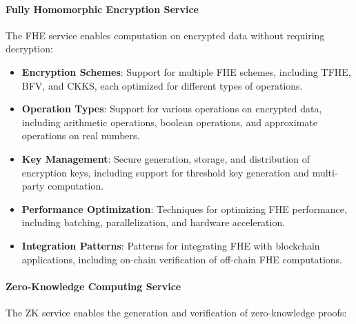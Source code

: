 \paragraph{Fully Homomorphic Encryption Service}
The FHE service enables computation on encrypted data without requiring decryption:

\begin{itemize}
    \item \textbf{Encryption Schemes}: Support for multiple FHE schemes, including TFHE, BFV, and CKKS, each optimized for different types of operations.
    
    \item \textbf{Operation Types}: Support for various operations on encrypted data, including arithmetic operations, boolean operations, and approximate operations on real numbers.
    
    \item \textbf{Key Management}: Secure generation, storage, and distribution of encryption keys, including support for threshold key generation and multi-party computation.
    
    \item \textbf{Performance Optimization}: Techniques for optimizing FHE performance, including batching, parallelization, and hardware acceleration.
    
    \item \textbf{Integration Patterns}: Patterns for integrating FHE with blockchain applications, including on-chain verification of off-chain FHE computations.
\end{itemize}

\paragraph{Zero-Knowledge Computing Service}
The ZK service enables the generation and verification of zero-knowledge proofs:

